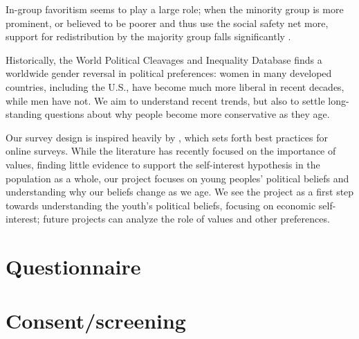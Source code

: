 \documentclass[11pt, headsepline]{article}
\begin{document}

In-group favoritism seems to play a large role; when the minority group is more prominent, or believed to be poorer and thus use the social safety net more, support for redistribution by the majority group falls significantly \citep{fischbacher2023identity, alesina2023immigration}. 

Historically, the World Political Cleavages and Inequality Database \citep{gethin2022political} finds a worldwide gender reversal in political preferences: women in many developed countries, including the U.S., have become much more liberal in recent decades, while men have not. We aim to understand recent trends, but also to settle long-standing questions about why people become more conservative as they age.

Our survey design is inspired heavily by \cite{stantcheva2023run}, which sets forth best practices for online surveys. While the literature has recently focused on the importance of values, finding little evidence to support the self-interest hypothesis in the population as a whole, our project focuses on young peoples' political beliefs and understanding why our beliefs change as we age. We see the project as a first step towards understanding the youth's political beliefs, focusing on economic self-interest; future projects can analyze the role of values and other preferences.

\newpage
\section*{\centering \LARGE \normalfont Questionnaire}

\section*{Consent/screening}
\end{document}
